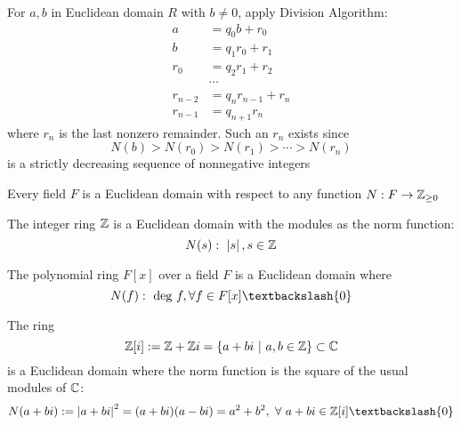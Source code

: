 \begin{remark}
For $a,b$ in Euclidean domain $R$ with $b \neq 0$, apply Division Algorithm:
\begin{align}
	a &= q_0 b + r_0 \nonumber \\
	b &= q_1 r_0 + r_1 \nonumber \\
	r_0 &= q_2 r_1 + r_2 \nonumber \\
	&\cdots \nonumber \\
	r_{n-2} &= q_n r_{n-1} + r_n \nonumber \\
	r_{n-1} &= q_{n+1} r_n \nonumber
\end{align}
where $r_n$ is the last nonzero remainder. Such an $r_n$ exists since
\begin{equation}
N(b) > N(r_0) > N(r_1) > \cdots > N(r_n) \nonumber
\end{equation}
is a strictly decreasing sequence of nonnegative integers
\end{remark}

\begin{example}
Every field $F$ is a Euclidean domain with respect to any function $N: F \rightarrow \mathbb{Z}_{\geq 0}$
\end{example}

\begin{example}
The integer ring $\mathbb{Z}$ is a Euclidean domain with the modules as the norm function:
\begin{equation}
N(s) :\ \left\lvert s\right\rvert, s \in \mathbb{Z} \nonumber
\end{equation}	
\end{example}

\begin{example}
The polynomial ring $F[x]$ over a field $F$ is a Euclidean domain where
\begin{equation}
N(f) :\ \degs \ f, \forall f \in F[x] \textbackslash \{0\} \nonumber
\end{equation}	
\end{example}

\begin{example}
The  ring
\begin{equation}
\Z [i] := \Z + \Z i = \{a+bi\ |\ a,b \in \Z \} \subset \C \nonumber
\end{equation}	
is a Euclidean domain where the norm function is the square of the usual modules of $\mathbb{C}$:
\begin{equation}
N(a+bi) := \abs{a+bi}^2 = (a+bi)(a-bi) = a^2 + b^2, \ \forall \ a+bi \in \Z [i] \textbackslash \{0\} \nonumber
\end{equation}
\end{example}

